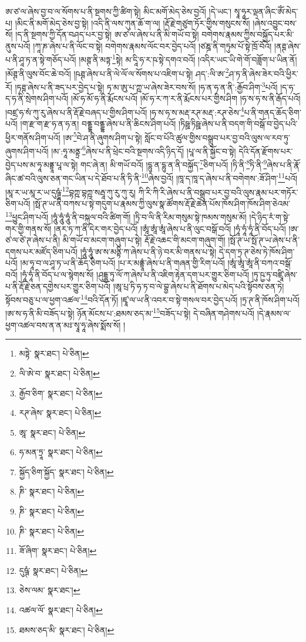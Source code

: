 ཨ་ཙ་ལ་ཞེས་བྱ་བ་ལ་སོགས་པ་ནི་སྔགས་ཀྱི་ཚིག་སྟེ། མིང་མགོ་མེད་ཅེས་བྱའོ། །དེ་ཡང་། སྭཱ་ཧཱར་ལྡན་ཞིང་ཨོཾ་མེད་པ། །མིང་ནི་མགོ་མེད་ཅེས་བྱ་སྟེ། །འདི་ནི་ལས་ཀུན་ཆོ་ག་ལ། །རྡོ་རྗེ་གཙུག་ཏོར་གྱིས་གསུངས་སོ། །ཞེས་འབྱུང་བས་སོ། །ད་ནི་སྔགས་ཀྱི་དོན་བཤད་པར་བྱ་སྟེ། ཨ་ཙ་ལ་ཞེས་པ་ནི་མི་གཡོ་བ་སྟེ། བགེགས་རྣམས་ཀྱིས་བསྐྱོད་པར་མི་ནུས་པའོ། །ཀཱ་ཎ་ཞེས་པ་ནི་ལོང་བ་སྟེ། བགེགས་རྣམས་ལོང་བར་བྱེད་པའོ། །ཙཎྜ་ནི་གཏུམ་པོ་སྟེ་ཁྲོ་བོའོ། །ནཊྚ་ཞེས་པ་ནི་ཤཱ་ཏ་ན་སྟེ་གཅོད་པའོ། །མཊྚ་ནི་མཏྟ་\footnote{མཏྟེ་  སྣར་ཐང་།  པེ་ཅིན། }སྟེ། མ་དཱི་ཧ་ར་ཥ་སྟེ་དགའ་བའོ། །འདིར་ཡང་ཡི་གེ་གོ་བཟློག་པ་ཡིན་ནོ། །མོཊྚ་ནི་ལུས་བོང་ཆེ་བའོ། །ཥཊྚ་ཞེས་པ་ནི་ལེ་ལོ་ལ་སོགས་པ་འཇིག་པ་སྟེ། ཤད་:ལི་ཨ་\footnote{ལི་ཨེ་བ་  སྣར་ཐང་།  པེ་ཅིན། }ཤ་ཏ་ནི་ཞེས་ཟེར་བའི་ཕྱིར་རོ། །ཏཊྚ་ཞེས་པ་ནི་ཟད་པར་བྱེད་པ་སྟེ། ཏ་མ་ཨུ་པ་ཀྵ་ཡ་ཞེས་ཟེར་བས་སོ། །ཧ་ན་ཧ་ན་ནི་:རྒྱོབ་ཤིག་\footnote{རྒྱོབ་ཅིག་  སྣར་ཐང་།  པེ་ཅིན། }པའོ། །ད་ཧ་ད་ཧ་ནི་སྲེགས་ཤིག་པའོ། །མོ་ཧ་མོ་ཧ་ནི་རྨོངས་པའོ། །མོ་ཧ་ར་ཀ་ར་ནི་རྨོངས་པར་གྱིས་ཤིག །ཧ་ས་ཧ་ས་ནི་རྒོད་པའོ། །བཛྲ་ཧ་སཾ་ཀུ་རུ་ཞེས་པ་ནི་རྡོ་རྗེ་བཞད་པ་གྱིས་ཤིག་པའོ། །ཧ་ས་ཧ་ས་མརྡ་རཊ་མརྡ་:རཊ་ཅེས་\footnote{རཊ་ཞེས་  སྣར་ཐང་།  པེ་ཅིན། }པ་ནི་གནད་ཆོད་ཅིག་པའོ། །ག་རྫ་ག་རྫ་ཧ་ན་ཧ་ན། བནྡྷ་བནྡྷ་ཞེས་པ་ནི་ཆིངས་ཤིག་པའོ། །ཏིཥྛ་ཏིཥྛ་ཞེས་པ་ནི་བདག་གི་བསྒོ་བ་བྱེད་པའི་ཕྱིར་གནོས་ཤིག་པའོ། །ཨ་\footnote{ཨཱ་  སྣར་ཐང་།  པེ་ཅིན། }བེ་ཤ་ནི་ཞུགས་ཤིག་པ་སྟེ། སློང་བ་པོའི་ཚུལ་གྱིས་བསྒྲུབ་པར་བྱ་བའི་ལུས་ལ་རབ་ཏུ་ཞུགས་ཤིག་པའོ། །མ་:ཧཱ་མནྟྲ་\footnote{ཧ་མན་ཏྲཱ་  སྣར་ཐང་།  པེ་ཅིན། }ཞེས་པ་ནི་ཕྲེང་བའི་སྔགས་འདི་ཉིད་དོ། །པཱ་ལ་ནི་སྐྱོང་བ་སྟེ། དེའི་དོན་རྫོགས་པར་བྱེད་པས་མ་ཧཱ་མནྟྲཱ་པཱ་ལ་སྟེ། གང་ཞེ་ན། མི་གཡོ་བའོ། །དྷུ་ན་དྷུ་ན་ནི་བསྐྱོད་\footnote{སྐྱོད་ཅིག་སྐྱོད་  སྣར་ཐང་།  པེ་ཅིན། }ཅིག་པའོ། །ཏི་ནི་\footnote{ཎི་  སྣར་ཐང་།  པེ་ཅིན། }ཏི་ནི་\footnote{ཎི་  སྣར་ཐང་།  པེ་ཅིན། }ཞེས་པ་ནི་རྣོ་ཞིང་ཚ་བའི་ལུས་ཅན་གང་ཡིན་པ་དེ་ཐོབ་པ་ནི་ཏི་ནི་\footnote{ཎི་  སྣར་ཐང་།  པེ་ཅིན། }ཞེས་བྱའོ། །ཁཱ་ད་ཁཱ་ད་ཞེས་པ་ནི་བགེགས་:ཟོ་ཤིག་\footnote{ཟོ་ཞིག་  སྣར་ཐང་།  པེ་ཅིན། }པའོ། །མཱ་ར་ཡ་མཱ་ར་ཡ་དུཥྚཱཾ་\footnote{དུཥྚཾ་  སྣར་ཐང་།  པེ་ཅིན། }བྷཀྵ་བྷཀྵ་སརྦཱ་ཀུ་རུ་ཀུ་རུ། ཀི་རི་ཀི་རི་ཞེས་པ་ནི་བསྒྲུབ་པར་བྱ་བའི་ལུས་རྣམ་པར་གཏོར་ཅིག་པའོ། །སྥོ་ཊ་ཡ་ནི་བཀས་པ་སྟེ་གདུག་པ་རྣམས་ཀྱི་ལུས་སྣ་ཚོགས་རྡོ་རྗེ་ཆེན་པོས་ཁོས་ཤིག་ཁོས་ཤིག་ཅེའམ་\footnote{ཅེས་ལམ་  སྣར་ཐང་། }ཕྱུང་ཤིག་པའོ། །ཧཱུཾ་ཧཱུཾ་ཧཱུཾ་ནི་བསྐུལ་བའི་ཚིག་གོ། །ཏྲི་བ་ལི་ནི་རིམ་གསུམ་སྟེ་ཁམས་གསུམ་མོ། །དེ་ཉིད་རཾ་ག་སྟེ་གར་གྱི་གནས་སོ། །ནར་ཏ་ཀ་ནི་དེར་གར་བྱེད་པའོ། །ཨཱཾ་ཨཱཾ་ཨཱཾ་ཞེས་པ་ནི་ལུང་བསྒོ་བའོ། །ཧཱཾ་ཧཱཾ་ཧཱཾ་ནི་བོད་པའོ། །ཨ་ཙ་ལ་ཙེ་ཊ་ཞེས་པ་ནི། མི་གཡོ་བ་མངག་གཞུག་པ་སྟེ། རྡོ་རྗེ་འཆང་གི་མངག་གཞུག་གོ། །སྥོ་ཊ་ཡ་སྥོ་ཊ་ཡ་ཞེས་པ་ནི་དགས་པར་མཛོད་ཅིག་པའོ། །ཧཱུཾ་ཧཱུཾ་ཨ་ས་མནྟི་ཀ་ཞེས་པ་ནི་ཉེ་བར་མི་གནས་པ་སྟེ། དེ་དག་ཏྲ་ཊ་ཅེས་ཏེ་ཁོས་ཤིག་པའོ། །མ་ཧཱ་བ་ལ་ཤཱ་ཏ་ཡ་ནི་ཆོད་ཅིག་པའོ། །པ་ར་མནྟྲཱཾ་ཞེས་པ་ནི་གཞན་གྱི་རིག་པའོ། །ཨཱཾ་ཨཱཾ་ཨཱཾ་ནི་བཀའ་བསྒོ་བའོ། །ཧཱཾ་ཧཱཾ་ནི་བོད་པ་ལ་སྙེགས་སོ། །ཤུདྡྷྱ་ཏུ་ལོ་ཀ་ཞེས་པ་ནི་འཇིག་རྟེན་དག་པར་གྱུར་ཅིག་པའོ། །ཏུ་ཥྱ་ཏུ་བཛྲཱི་ཞེས་པ་ནི་རྡོ་རྗེ་ཅན་དགྱེས་པར་གྱུར་ཅིག་པའོ། །ཨཱ་པྲ་ཏི་ཧ་ཏ་བ་ལེ་བྷྱ་ཞེས་པ་ནི་ཐོགས་པ་མེད་པའི་སྟོབས་ཅན་ཏེ། སྟོབས་བཅུ་པ་ལ་ཕྱག་འཚལ་\footnote{འཚལ་ལོ་  སྣར་ཐང་།  པེ་ཅིན། }བའི་དོན་ཏོ། །ཛྭཱ་ལ་ཡ་ནི་འབར་བ་སྟེ་གསལ་བར་བྱེད་པའོ། །ཏྲ་ཊ་ནི་ཁོས་ཤིག་པའོ། །ཨ་ས་ཧ་ནི་མི་བཟོད་པ་སྟེ། ཉོན་མོངས་པ་:ཐམས་ཅད་མ་\footnote{ཐམས་ཅད་མི་  སྣར་ཐང་།  པེ་ཅིན། }བཟོད་པ་སྟེ། དེ་བཞིན་གཤེགས་པའོ། །དེ་རྣམས་ལ་ཕྱག་འཚལ་བས་ན་ན་མཿ་སྭཱ་ཧཱ་ཞེས་སྨོས་སོ། །
